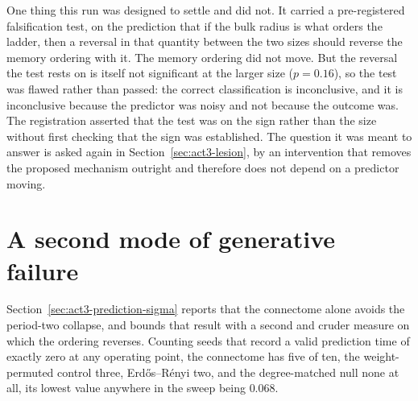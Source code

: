 One thing this run was designed to settle and did not. It carried a
pre-registered falsification test, on the prediction that if the bulk radius is
what orders the ladder, then a reversal in that quantity between the two sizes
should reverse the memory ordering with it. The memory ordering did not move.
But the reversal the test rests on is itself not significant at the larger size
($p = 0.16$), %
so the test was flawed rather than passed: the correct classification is
inconclusive, and it is inconclusive because the predictor was noisy and not
because the outcome was. The registration asserted that the test was on the sign
rather than the size without first checking that the sign was established. The
question it was meant to answer is asked again in
Section~\ref{sec:act3-lesion}, by an intervention that removes the
proposed mechanism outright and therefore does not depend on a predictor moving.




\section{A second mode of generative failure}
\label{app:second-failure}
\bigskip

Section~\ref{sec:act3-prediction-sigma} reports that the connectome alone avoids
the period-two collapse, and bounds that result with a second and cruder measure
on which the ordering reverses. Counting seeds that record a valid prediction
time of exactly zero at any operating point, the connectome has
five of ten, %
the weight-permuted control
three, %
Erdős--Rényi
two, %
and the degree-matched null none at all, its lowest value anywhere in the sweep
being
$0.068$. %

